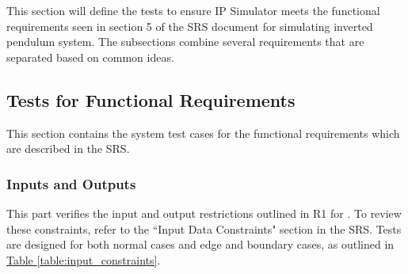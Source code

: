 \documentclass[12pt, titlepage]{article}
\begin{document}
This section will define the tests to ensure IP Simulator meets
the functional requirements seen in section 5 of the SRS document
for simulating inverted pendulum system. The subsections combine
several requirements that are separated based on common ideas.

\subsection{Tests for Functional Requirements}

This section contains the system test cases for the functional
requirements which are described in the SRS.



\subsubsection{Inputs and Outputs}

This part verifies the input and output restrictions outlined in R1 for \progname{}.
To review these constraints, refer to the ``Input Data Constraints" section in the SRS.
Tests are designed for both normal cases and edge and boundary cases, as outlined
in \hyperref[table:input_constraints]{Table \ref*{table:input_constraints}}.

\end{document}
